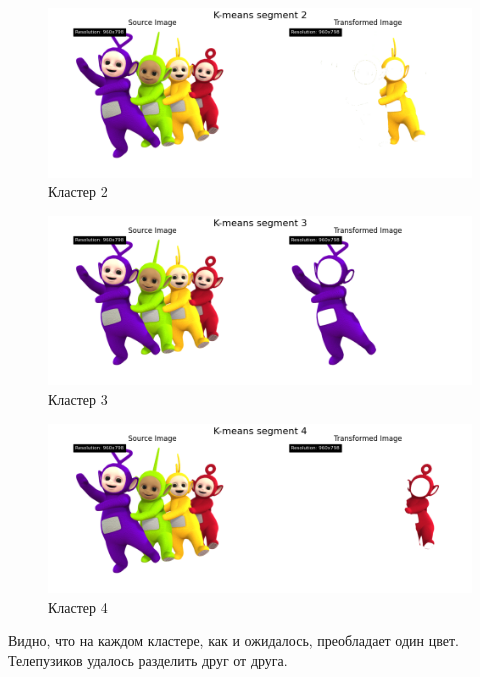 \begin{figure}[ht!]
    \centering
    \includegraphics[width=\textwidth]{../results/K-means segment 2.png}
    \caption{Кластер 2}
    \label{img:kmeans_cluster_2}
\end{figure}

\begin{figure}[ht!]
    \centering
    \includegraphics[width=\textwidth]{../results/K-means segment 3.png}
    \caption{Кластер 3}
    \label{img:kmeans_cluster_3}
\end{figure}

\begin{figure}[ht!]
    \centering
    \includegraphics[width=\textwidth]{../results/K-means segment 4.png}
    \caption{Кластер 4}
    \label{img:kmeans_cluster_4}
\end{figure}

\FloatBarrier
Видно, что на каждом кластере, как и ожидалось, преобладает один цвет. Телепузиков удалось разделить друг от друга. 

